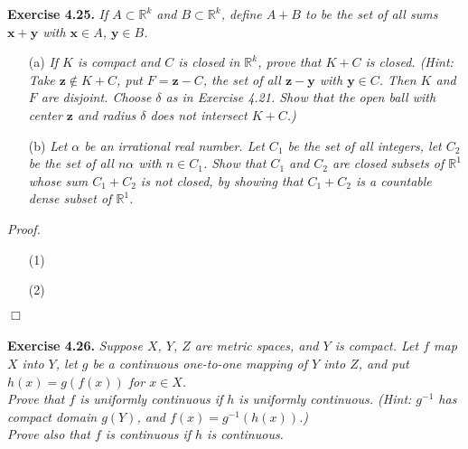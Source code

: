 \documentclass{article}
\begin{document}



\textbf{Exercise 4.25.}
\emph{If $A \subset \mathbb{R}^k$ and $B \subset \mathbb{R}^k$,
define $A+B$ to be the set of all sums $\mathbf{x}+\mathbf{y}$ with
$\mathbf{x} \in A$, $\mathbf{y} \in B$.}

\begin{enumerate}
\item[(a)]
\emph{If $K$ is compact and $C$ is closed in $\mathbb{R}^k$,
prove that $K+C$ is closed.
(Hint: Take $\mathbf{z} \notin K+C$,
put $F = \mathbf{z}-C$,
the set of all $\mathbf{z}-\mathbf{y}$ with $\mathbf{y} \in C$.
Then $K$ and $F$ are disjoint.
Choose $\delta$ as in Exercise 4.21.
Show that the open ball with center $\mathbf{z}$ and radius $\delta$ does not intersect $K+C$.)}
\item[(b)]
\emph{Let $\alpha$ be an irrational real number.
Let $C_1$ be the set of all integers,
let $C_2$ be the set of all $n \alpha$ with $n \in C_1$.
Show that $C_1$ and $C_2$ are closed subsets of $\mathbb{R}^1$
whose sum $C_1 + C_2$ is not closed,
by showing that $C_1 + C_2$ is a countable dense subset of $\mathbb{R}^1$.} \\
\end{enumerate}

\emph{Proof.}
\begin{enumerate}
\item[(1)]

\item[(2)]
\end{enumerate}
$\Box$\\\\






\textbf{Exercise 4.26.}
\emph{Suppose $X$, $Y$, $Z$ are metric spaces, and $Y$ is compact.
Let $f$ map $X$ into $Y$,
let $g$ be a continuous one-to-one mapping of $Y$ into $Z$,
and put $h(x) = g(f(x))$ for $x \in X$.} \\

\emph{Prove that $f$ is uniformly continuous if $h$ is uniformly continuous.
(Hint: $g^{-1}$ has compact domain $g(Y)$, and $f(x) = g^{-1}(h(x))$.)} \\

\emph{Prove also that $f$ is continuous if $h$ is continuous. } \\
\end{document}
